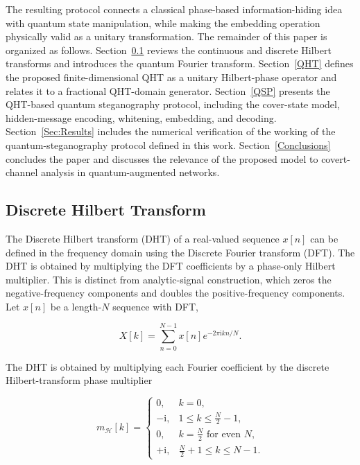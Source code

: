 \documentclass[11pt]{article}
\theoremstyle{plain}
\theoremstyle{definition}
\theoremstyle{remark}
\begin{document}
The resulting protocol connects a classical phase-based information-hiding idea with quantum state manipulation, while making the embedding operation physically valid as a unitary transformation. The remainder of this paper is organized as follows. Section~\ref{HT} reviews the continuous and discrete Hilbert transforms and introduces the quantum Fourier transform. Section~\ref{QHT} defines the proposed finite-dimensional QHT as a unitary Hilbert-phase operator and relates it to a fractional QHT-domain generator. Section~\ref{QSP} presents the QHT-based quantum steganography protocol, including the cover-state model, hidden-message encoding, whitening, embedding, and decoding. Section~\ref{Sec:Results} includes the numerical verification of the working of the quantum-steganography protocol defined in this work. Section~\ref{Conclusions} concludes the paper and discusses the relevance of the proposed model to covert-channel analysis in quantum-augmented networks.

\subsection{Discrete Hilbert Transform}
\label{HT}

The Discrete Hilbert transform (DHT) of a real-valued sequence $x[n]$ can be defined in the frequency domain using the Discrete Fourier transform (DFT). The DHT is obtained by multiplying the DFT coefficients by a phase-only Hilbert multiplier. This is distinct from analytic-signal construction, which zeros the negative-frequency components and doubles the positive-frequency components. Let $x[n]$ be a length-$N$ sequence with DFT,

\begin{equation}
X[k]
=
\sum_{n=0}^{N-1}
x[n]e^{-2\pi \mathrm{i}kn/N}.
\end{equation}

The DHT is obtained by multiplying each Fourier coefficient by the discrete Hilbert-transform phase multiplier

\begin{equation}
m_{\mathcal{H}}[k] =
\begin{cases}
0, & k=0,\\
-\mathrm{i}, & 1\leq k\leq \frac{N}{2}-1,\\
0, & k=\frac{N}{2} \text{ for even } N,\\
+\mathrm{i}, & \frac{N}{2}+1\leq k\leq N-1.
\end{cases}
\label{eq:dht-phase-mask}
\end{equation}
\end{document}
